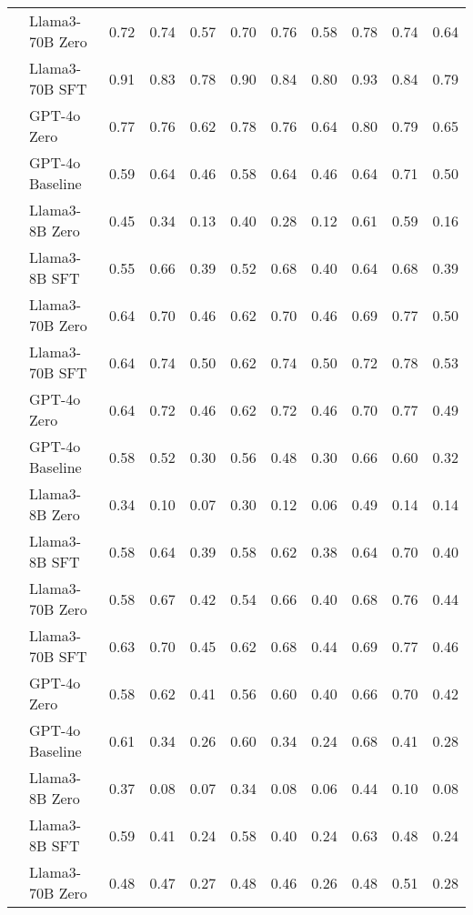 \begin{longtable}[t]{l>{}l|rr>{}r|rr>{}r|rrr}
\nopagebreak
 & Llama3-70B Zero & 0.72 & 0.74 & 0.57 & 0.70 & 0.76 & 0.58 & 0.78 & 0.74 & 0.64\\
\nopagebreak
 & Llama3-70B SFT & 0.91 & 0.83 & 0.78 & 0.90 & 0.84 & 0.80 & 0.93 & 0.84 & 0.79\\
\nopagebreak
 & GPT-4o Zero & 0.77 & 0.76 & 0.62 & 0.78 & 0.76 & 0.64 & 0.80 & 0.79 & 0.65\\
\nopagebreak
 & GPT-4o Baseline & 0.59 & 0.64 & 0.46 & 0.58 & 0.64 & 0.46 & 0.64 & 0.71 & 0.50\\
\cmidrule{1-11}\pagebreak[0]
2 & Llama3-8B Zero & 0.45 & 0.34 & 0.13 & 0.40 & 0.28 & 0.12 & 0.61 & 0.59 & 0.16\\
\nopagebreak
 & Llama3-8B SFT & 0.55 & 0.66 & 0.39 & 0.52 & 0.68 & 0.40 & 0.64 & 0.68 & 0.39\\
\nopagebreak
 & Llama3-70B Zero & 0.64 & 0.70 & 0.46 & 0.62 & 0.70 & 0.46 & 0.69 & 0.77 & 0.50\\
\nopagebreak
 & Llama3-70B SFT & 0.64 & 0.74 & 0.50 & 0.62 & 0.74 & 0.50 & 0.72 & 0.78 & 0.53\\
\nopagebreak
 & GPT-4o Zero & 0.64 & 0.72 & 0.46 & 0.62 & 0.72 & 0.46 & 0.70 & 0.77 & 0.49\\
\nopagebreak
 & GPT-4o Baseline & 0.58 & 0.52 & 0.30 & 0.56 & 0.48 & 0.30 & 0.66 & 0.60 & 0.32\\
\cmidrule{1-11}\pagebreak[0]
3 & Llama3-8B Zero & 0.34 & 0.10 & 0.07 & 0.30 & 0.12 & 0.06 & 0.49 & 0.14 & 0.14\\
\nopagebreak
 & Llama3-8B SFT & 0.58 & 0.64 & 0.39 & 0.58 & 0.62 & 0.38 & 0.64 & 0.70 & 0.40\\
\nopagebreak
 & Llama3-70B Zero & 0.58 & 0.67 & 0.42 & 0.54 & 0.66 & 0.40 & 0.68 & 0.76 & 0.44\\
\nopagebreak
 & Llama3-70B SFT & 0.63 & 0.70 & 0.45 & 0.62 & 0.68 & 0.44 & 0.69 & 0.77 & 0.46\\
\nopagebreak
 & GPT-4o Zero & 0.58 & 0.62 & 0.41 & 0.56 & 0.60 & 0.40 & 0.66 & 0.70 & 0.42\\
\nopagebreak
 & GPT-4o Baseline & 0.61 & 0.34 & 0.26 & 0.60 & 0.34 & 0.24 & 0.68 & 0.41 & 0.28\\
\cmidrule{1-11}\pagebreak[0]
4 & Llama3-8B Zero & 0.37 & 0.08 & 0.07 & 0.34 & 0.08 & 0.06 & 0.44 & 0.10 & 0.08\\
\nopagebreak
 & Llama3-8B SFT & 0.59 & 0.41 & 0.24 & 0.58 & 0.40 & 0.24 & 0.63 & 0.48 & 0.24\\
\nopagebreak
 & Llama3-70B Zero & 0.48 & 0.47 & 0.27 & 0.48 & 0.46 & 0.26 & 0.48 & 0.51 & 0.28\\

\end{longtable}
